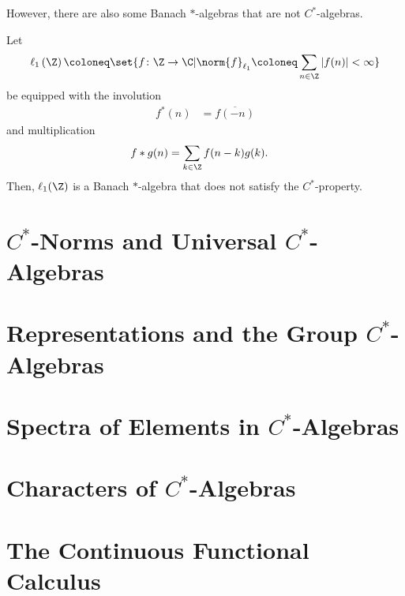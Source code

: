 However, there are also some Banach $\ast$-algebras that are not $C^{\ast}$-algebras.
\begin{example}
  Let 
  \begin{align*}
    \ell_1\left( \Z \right)\coloneq \set{f\colon \Z\rightarrow\C | \norm{f}_{\ell_1} \coloneq \sum_{n\in\Z}\left\vert f(n) \right\vert < \infty}
  \end{align*}
  be equipped with the involution
  \begin{align*}
    f^{\ast}\left( n \right) &= \overline{f\left( -n \right)}
  \end{align*}
  and multiplication
  \begin{align*}
    f\ast g(n) &= \sum_{k\in\Z}f(n-k)g(k).
  \end{align*}
  Then, $\ell_1(\Z)$ is a Banach $\ast$-algebra that does not satisfy the $C^{\ast}$-property.
\end{example}
\section{$C^{\ast}$-Norms and Universal $C^{\ast}$-Algebras}%
\section{Representations and the Group $C^{\ast}$-Algebras}%
\section{Spectra of Elements in $C^{\ast}$-Algebras}%
\section{Characters of $C^{\ast}$-Algebras}%
\section{The Continuous Functional Calculus}%
